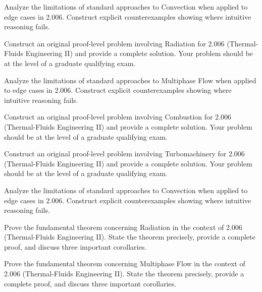 \documentclass[12pt,a4paper]{exam}
\begin{document}
\begin{questions}

\question[2]
Analyze the limitations of standard approaches to Convection when applied to edge cases in 2.006. Construct explicit counterexamples showing where intuitive reasoning fails.

\vspace{0.3cm}

\question[5]
Construct an original proof-level problem involving Radiation for 2.006 (Thermal-Fluids Engineering II) and provide a complete solution. Your problem should be at the level of a graduate qualifying exam.

\vspace{0.3cm}

\question[4]
Analyze the limitations of standard approaches to Multiphase Flow when applied to edge cases in 2.006. Construct explicit counterexamples showing where intuitive reasoning fails.

\vspace{0.3cm}

\question[6]
Construct an original proof-level problem involving Combustion for 2.006 (Thermal-Fluids Engineering II) and provide a complete solution. Your problem should be at the level of a graduate qualifying exam.

\vspace{0.3cm}

\question[2]
Construct an original proof-level problem involving Turbomachinery for 2.006 (Thermal-Fluids Engineering II) and provide a complete solution. Your problem should be at the level of a graduate qualifying exam.

\vspace{0.3cm}

\question[5]
Analyze the limitations of standard approaches to Convection when applied to edge cases in 2.006. Construct explicit counterexamples showing where intuitive reasoning fails.

\vspace{0.3cm}

\question[7]
Prove the fundamental theorem concerning Radiation in the context of 2.006 (Thermal-Fluids Engineering II). State the theorem precisely, provide a complete proof, and discuss three important corollaries.

\vspace{0.3cm}

\question[3]
Prove the fundamental theorem concerning Multiphase Flow in the context of 2.006 (Thermal-Fluids Engineering II). State the theorem precisely, provide a complete proof, and discuss three important corollaries.


\end{questions}
\end{document}
